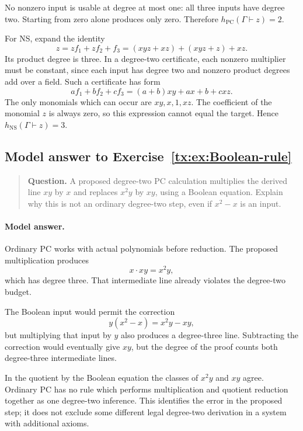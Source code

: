 \documentclass[11pt,a4paper,oneside,openany]{book}
\theoremstyle{definition}\newtheorem{definition}[theorem]{Definition}
\theoremstyle{remark}\newtheorem{remark}[theorem]{Remark}
\newcommand{\NS}{\mathrm{NS}}\newcommand{\PC}{\mathrm{PC}}
\numberwithin{equation}{chapter}
\begin{document}
No nonzero input is usable at degree at most one: all three inputs
have degree two. Starting from zero alone produces only zero.
Therefore \(h_{\PC}(\Gamma\vdash z)=2\).

For NS, expand the identity
\[
 z=zf_1+zf_2+f_3
   =(xyz+xz)+(xyz+z)+xz.
\]
Its product degree is three. In a degree-two certificate, each nonzero
multiplier must be constant, since each input has degree two and
nonzero product degrees add over a field. Such a certificate has form
\[
 af_1+bf_2+cf_3=(a+b)xy+ax+b+cxz.
\]
The only monomials which can occur are \(xy,x,1,xz\). The coefficient
of the monomial \(z\) is always zero, so this expression cannot equal
the target. Hence \(h_{\NS}(\Gamma\vdash z)=3\).


\par


\begin{samepage}

\subsection*{Model answer to Exercise~\ref{tx:ex:Boolean-rule}}\label{tx:ans:Boolean-rule}

\begin{quote}\small\textbf{Question.} A proposed degree-two PC calculation multiplies the derived line $xy$
by $x$ and replaces $x^2y$ by $xy$, using a Boolean equation. Explain
why this is not an ordinary degree-two step, even if $x^2-x$ is an input.
\end{quote}

\paragraph{Model answer.}
Ordinary PC works with actual polynomials before reduction. The
proposed multiplication produces
\[
                         x\cdot xy=x^2y,
\]
which has degree three. That intermediate line already violates the
degree-two budget.
\end{samepage}

The Boolean input would permit the correction
\[
                 y(x^2-x)=x^2y-xy,
\]
but multiplying that input by \(y\) also produces a degree-three line.
Subtracting the correction would eventually give \(xy\), but the
degree of the proof counts both degree-three intermediate lines.

In the quotient by the Boolean equation the classes of \(x^2y\)
and \(xy\) agree. Ordinary PC has no rule which performs multiplication
and quotient reduction together as one degree-two inference.
This identifies the error in the proposed step; it does not exclude
some different legal degree-two derivation in a system with additional axioms.
\end{document}
